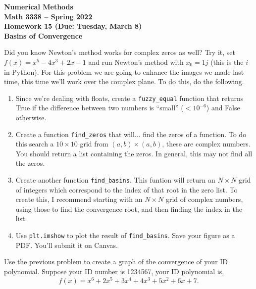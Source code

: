 \documentclass[11pt,letterpaper]{article}
\newcommand{\semester}{Spring 2022}
\newcommand{\due}{Tuesday, March 8}
\begin{document}
\begin{center}
{\huge{\bf  Numerical Methods}} \\[1.5ex]
{\bf Math 3338 -- \semester}\\[1.5ex]
{\Large{\bf Homework 15 (Due: \due)\ \\[2ex] Basins of Convergence}}\\
\end{center}
\vspace{2mm}



\begin{problem}
 Did you know Newton's method works for complex zeros as well? Try it, set $f(x)=x^5-4x^3+2x-1$
and run Newton's method with $x_0=1j$ (this is the $i$ in Python). For this problem we are going 
to enhance the images we made last time, this time we'll work over the complex plane. To do
this, do the following.
\begin{enumerate}
 \item Since we're dealing with floats, create a \texttt{fuzzy\_equal} function that returns True
if the difference between two numbers is ``small'' ($<10^{-6}$) and False otherwise.

 \item Create a function \texttt{find\_zeros} that will... find the zeros of a function. To do
this search a $10\times 10$ grid from $(a,b)\times (a,b)$, these are complex numbers. You should
return a list containing the zeros. In general, this may not find all the zeros. 

\item Create another function \texttt{find\_basins}. This funtion will return an $N\times N$ grid
of integers which correspond to the index of that root in the zero list. To create this, I recommend
starting with an $N\times N$ grid of complex numbers, using those to find the convergence root,
and then finding the index in the list.

\item Use \texttt{plt.imshow} to plot the result of \texttt{find\_basins}. Save your figure as a 
PDF. You'll submit it on Canvas.

\end{enumerate}
\end{problem}


\begin{problem}
 Use the previous problem to create a graph of the convergence of your ID polynomial. Suppose your
ID number is 1234567, your ID polynomial is,
\[
 f(x) = x^6+2x^5+3x^4+4x^3+5x^2+6x+7.
\]
\end{problem}
\end{document}
